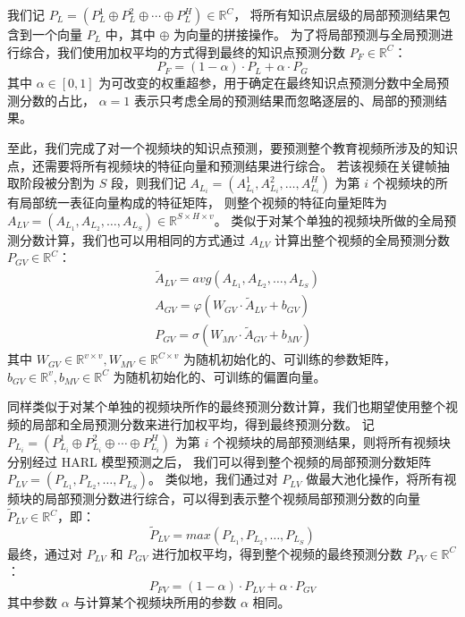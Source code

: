     我们记 $P_L = \left(P_L^1 \oplus P_L^2 \oplus \cdots \oplus P_L^H\right) \in \mathbb{R}^{C}$，
    将所有知识点层级的局部预测结果包含到一个向量 $P_L$ 中，其中 $\oplus$ 为向量的拼接操作。
    为了将局部预测与全局预测进行综合，我们使用加权平均的方式得到最终的知识点预测分数 $P_F \in \mathbb{R}^{C}$：
    \begin{equation}
        P_F = (1 - \alpha) \cdot P_L + \alpha \cdot P_G
    \end{equation}
    其中 $\alpha \in [0, 1]$ 为可改变的权重超参，用于确定在最终知识点预测分数中全局预测分数的占比，
    $\alpha = 1$ 表示只考虑全局的预测结果而忽略逐层的、局部的预测结果。

    至此，我们完成了对一个视频块的知识点预测，要预测整个教育视频所涉及的知识点，还需要将所有视频块的特征向量和预测结果进行综合。
    若该视频在关键帧抽取阶段被分割为 $S$ 段，则我们记 $A_{L_i} = \left(A_{L_i}^1, A_{L_i}^2, \dots, A_{L_i}^H\right)$ 为第 $i$ 个视频块的所有局部统一表征向量构成的特征矩阵，
    则整个视频的特征向量矩阵为 $A_{LV} = \left(A_{L_1}, A_{L_2}, \dots, A_{L_S}\right) \in \mathbb{R}^{S \times H \times v}$。
    类似于对某个单独的视频块所做的全局预测分数计算，我们也可以用相同的方式通过 $A_{LV}$ 计算出整个视频的全局预测分数 $P_{GV} \in \mathbb{R}^{C}$：
    \begin{equation}
        \begin{aligned}
            &\tilde{A}_{LV} = avg\left(A_{L_1}, A_{L_2}, \dots, A_{L_S}\right) \\
            &A_{GV} = \varphi\left(W_{GV} \cdot \tilde{A}_{LV} + b_{GV}\right) \\
            &P_{GV} = \sigma\left(W_{MV} \cdot \tilde{A}_{GV} + b_{MV}\right)
        \end{aligned}
    \end{equation}
    其中 $W_{GV} \in \mathbb{R}^{v \times v}, W_{MV} \in \mathbb{R}^{C \times v}$ 为随机初始化的、可训练的参数矩阵，
    $b_{GV} \in \mathbb{R}^{v}, b_{MV} \in \mathbb{R}^{C}$ 为随机初始化的、可训练的偏置向量。

    同样类似于对某个单独的视频块所作的最终预测分数计算，我们也期望使用整个视频的局部和全局预测分数来进行加权平均，得到最终预测分数。
    记 $P_{L_i} = \left(P_{L_i}^1 \oplus P_{L_i}^2 \oplus \cdots \oplus P_{L_i}^H\right)$ 为第 $i$ 个视频块的局部预测结果，则将所有视频块分别经过 HARL 模型预测之后，
    我们可以得到整个视频的局部预测分数矩阵 $P_{LV} = \left(P_{L_1}, P_{L_2}, \dots, P_{L_S}\right)$。
    类似地，我们通过对 $P_{LV}$ 做最大池化操作，将所有视频块的局部预测分数进行综合，可以得到表示整个视频局部预测分数的向量 $\tilde{P}_{LV} \in \mathbb{R}^{C}$，即：
    \begin{equation}
        \tilde{P}_{LV} = max\left(P_{L_1}, P_{L_2}, \dots, P_{L_S}\right)
    \end{equation}
    最终，通过对 $P_{LV}$ 和 $P_{GV}$ 进行加权平均，得到整个视频的最终预测分数 $P_{FV} \in \mathbb{R}^{C}$：
    \begin{equation}
        P_{FV} = (1 - \alpha) \cdot P_{LV} + \alpha \cdot P_{GV}
    \end{equation}
    其中参数 $\alpha$ 与计算某个视频块所用的参数 $\alpha$ 相同。


